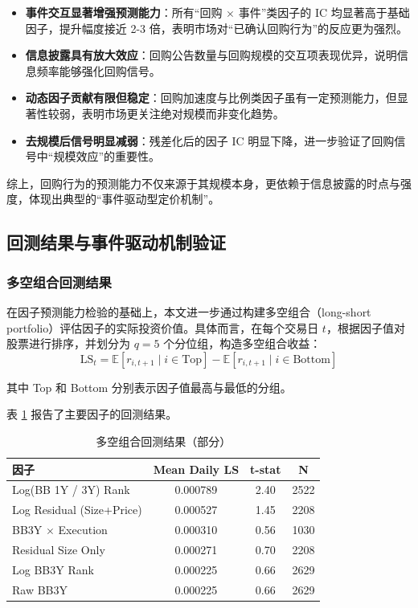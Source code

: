 \documentclass[a4paper,10pt]{article}
\begin{document}
\begin{itemize}
    \item \textbf{事件交互显著增强预测能力}：所有“回购 $\times$ 事件”类因子的 IC 均显著高于基础因子，提升幅度接近 2-3 倍，表明市场对“已确认回购行为”的反应更为强烈。
    
    \item \textbf{信息披露具有放大效应}：回购公告数量与回购规模的交互项表现优异，说明信息频率能够强化回购信号。
    
    \item \textbf{动态因子贡献有限但稳定}：回购加速度与比例类因子虽有一定预测能力，但显著性较弱，表明市场更关注绝对规模而非变化趋势。
    
    \item \textbf{去规模后信号明显减弱}：残差化后的因子 IC 明显下降，进一步验证了回购信号中“规模效应”的重要性。
\end{itemize}

综上，回购行为的预测能力不仅来源于其规模本身，更依赖于信息披露的时点与强度，体现出典型的“事件驱动型定价机制”。




\subsection{回测结果与事件驱动机制验证}

\subsubsection{多空组合回测结果}

在因子预测能力检验的基础上，本文进一步通过构建多空组合（long-short portfolio）评估因子的实际投资价值。具体而言，在每个交易日 $t$，根据因子值对股票进行排序，并划分为 $q=5$ 个分位组，构造多空组合收益：
\begin{equation}
\text{LS}_t = \mathbb{E}[r_{i,t+1} \mid i \in \text{Top}] - \mathbb{E}[r_{i,t+1} \mid i \in \text{Bottom}]
\end{equation}

其中 Top 和 Bottom 分别表示因子值最高与最低的分组。

表 \ref{tab:ls_result} 报告了主要因子的回测结果。

\begin{table}[H]
\centering
\caption{多空组合回测结果（部分）}
\label{tab:ls_result}
\begin{tabular}{lccc}
\toprule
因子 & Mean Daily LS & t-stat & N \\
\midrule
Log(BB 1Y / 3Y) Rank & 0.000789 & 2.40 & 2522 \\
Log Residual (Size+Price) & 0.000527 & 1.45 & 2208 \\
BB3Y $\times$ Execution & 0.000310 & 0.56 & 1030 \\
Residual Size Only & 0.000271 & 0.70 & 2208 \\
Log BB3Y Rank & 0.000225 & 0.66 & 2629 \\
Raw BB3Y & 0.000225 & 0.66 & 2629 \\
\bottomrule
\end{tabular}
\end{table}
\end{document}
